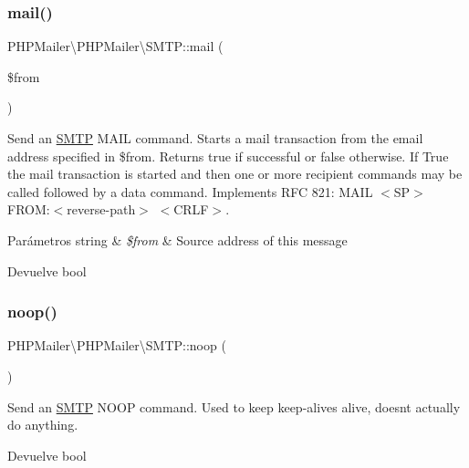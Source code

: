 \subsubsection{\texorpdfstring{mail()}{mail()}}
{\footnotesize\ttfamily P\+H\+P\+Mailer\textbackslash{}\+P\+H\+P\+Mailer\textbackslash{}\+S\+M\+T\+P\+::mail (\begin{DoxyParamCaption}\item[{}]{\$from }\end{DoxyParamCaption})}

Send an \hyperlink{classPHPMailer_1_1PHPMailer_1_1SMTP}{S\+M\+TP} M\+A\+IL command. Starts a mail transaction from the email address specified in \$from. Returns true if successful or false otherwise. If True the mail transaction is started and then one or more recipient commands may be called followed by a data command. Implements R\+FC 821\+: M\+A\+IL $<$\+S\+P$>$ F\+R\+OM\+:$<$reverse-\/path$>$ $<$\+C\+R\+L\+F$>$.


\begin{DoxyParams}[1]{Parámetros}
string & {\em \$from} & Source address of this message\\
\hline
\end{DoxyParams}
\begin{DoxyReturn}{Devuelve}
bool 
\end{DoxyReturn}
\mbox{\label{classPHPMailer_1_1PHPMailer_1_1SMTP_a2e6690a7ffca2f3b499babb48284a592}} 
\subsubsection{\texorpdfstring{noop()}{noop()}}
{\footnotesize\ttfamily P\+H\+P\+Mailer\textbackslash{}\+P\+H\+P\+Mailer\textbackslash{}\+S\+M\+T\+P\+::noop (\begin{DoxyParamCaption}{ }\end{DoxyParamCaption})}

Send an \hyperlink{classPHPMailer_1_1PHPMailer_1_1SMTP}{S\+M\+TP} N\+O\+OP command. Used to keep keep-\/alives alive, doesn\textquotesingle{}t actually do anything.

\begin{DoxyReturn}{Devuelve}
bool 
\end{DoxyReturn}
\mbox{\label{classPHPMailer_1_1PHPMailer_1_1SMTP_a1e37ec8121884138d43b236545a07ef6}} 
